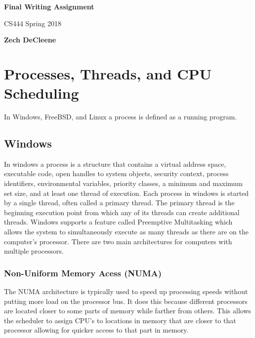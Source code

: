 \documentclass[a4paper,10pt,onecolumn]{article}
\begin{document}
\begin{titlepage}
    \begin{center}
        \vspace*{1cm}
        
        \textbf{Final Writing Assignment}
        
        \vspace{0.5cm}
        CS444 Spring 2018
        
        \vspace{1.5cm}
        
        \textbf{Zech DeCleene}       
    \end{center}
\end{titlepage}


\section{Processes, Threads, and CPU Scheduling}
In Windows, FreeBSD, and Linux a process is defined as a running program. 
\newline
\newline
\subsection{Windows}
In windows a process is a structure that contains a virtual address space, executable code, open handles to system objects, security context, process identifiers, environmental variables, priority classes, a minimum and maximum set size, and at least one thread of execution. Each process in windows is started by a single thread, often called a primary thread. The primary thread is the beginning execution point from which any of its threads can create additional threads. \cite{about}
\newline
\newline
Windows supports a feature called Preemptive Multitasking which allows the system to simultaneously execute as many threads as there are on the computer's processor. There are two main architectures for computers with multiple processors.
\subsubsection{{N}on-{U}niform {M}emory {A}cess {(NUMA)}}
The NUMA architecture is typically used to speed up processing speeds without putting more load on the processor bus. It does this because different processors are located closer to some parts of memory while farther from others. This allows the scheduler to assign CPU's to locations in memory that are closer to that processor allowing for quicker access to that part in memory.
\newline
\end{document}
